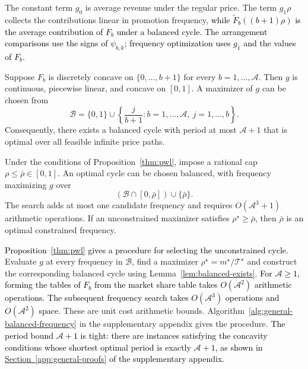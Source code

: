The constant term \(g_0\) is average revenue under the regular price. The term \(g_1\rho\) collects the contributions linear in promotion frequency, \textcolor{black}{while \(\widetilde F_b((b+1)\rho)\) is the average contribution of \(F_b\) under a balanced cycle.}
\textcolor{black}{The arrangement comparisons use the signs of \(\psi_{b,k}\); frequency optimization uses \(g_1\) and the values of \(F_b\).}

\begin{proposition}
    \label{thm:pwl}
Suppose \(F_b\) is discretely concave on \(\{0,\ldots,b+1\}\) for every \(b=1,\ldots,\mathcal A\). Then \(g\) is continuous, piecewise linear, and concave on \([0,1]\). A maximizer of \(g\) can be chosen from
\[
 \mathcal B=\{0,1\}\cup
 \left\{\frac{j}{b+1}:b=1,\ldots,\mathcal A,\ j=1,\ldots,b\right\}.
\]
Consequently, there exists a balanced cycle with period at most \(\mathcal A+1\) that is optimal over all feasible infinite price paths.
\end{proposition}

\begingroup\color{black}
\begin{corollary}
\label{cor:balanced-frequency-cap}
Under the conditions of Proposition~\ref{thm:pwl}, impose a rational cap \(\rho\le\bar\rho\in[0,1]\). An optimal cycle can be chosen balanced, with frequency maximizing \(g\) over
\[
    (\mathcal B\cap[0,\bar\rho])\cup\{\bar\rho\}.
\]
The search adds at most one candidate frequency and requires \(O(\mathcal A^3+1)\) arithmetic operations. If an unconstrained maximizer satisfies \(\rho^\star\ge\bar\rho\), then \(\bar\rho\) is an optimal constrained frequency.
\end{corollary}
\par\endgroup

\textcolor{black}{Proposition~\ref{thm:pwl} gives a procedure for selecting the unconstrained cycle.} Evaluate \(g\) at every frequency in \(\mathcal B\), find a maximizer \(\rho^\star=m^\star/\mathcal T^\star\) and construct the corresponding balanced cycle using Lemma~\ref{lem:balanced-exists}. \textcolor{black}{For \(\mathcal A\ge1\), forming the tables of \(F_b\) from the market share table takes \(O(\mathcal A^2)\) arithmetic operations. The subsequent frequency search takes \(O(\mathcal A^3)\) operations and \(O(\mathcal A^2)\) space.} These are unit cost arithmetic bounds. Algorithm~\ref{alg:general-balanced-frequency} in the supplementary appendix gives the procedure. \textcolor{black}{The period bound \(\mathcal A+1\) is tight: there are instances satisfying the concavity conditions whose shortest optimal period is exactly \(\mathcal A+1\), as shown in \hyperlink{proof-sharp-period}{Section~\ref*{app:general-proofs}} of the supplementary appendix.}

